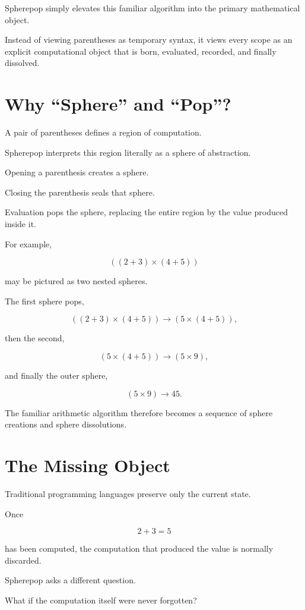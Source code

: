 \documentclass[12pt,oneside]{article}
\theoremstyle{definition}
\theoremstyle{remark}
\begin{document}
Spherepop simply elevates this familiar algorithm into the primary
mathematical object.

Instead of viewing parentheses as temporary syntax,
it views every scope as an explicit computational object that is born,
evaluated,
recorded,
and finally dissolved.

\section{Why ``Sphere'' and ``Pop''?}

A pair of parentheses defines a region of computation.

Spherepop interprets this region literally as a sphere of abstraction.

Opening a parenthesis creates a sphere.

Closing the parenthesis seals that sphere.

Evaluation pops the sphere,
replacing the entire region by the value produced inside it.

For example,

\[
((2+3)\times(4+5))
\]

may be pictured as two nested spheres.

The first sphere pops,

\[
((2+3)\times(4+5))
\rightarrow
(5\times(4+5)),
\]

then the second,

\[
(5\times(4+5))
\rightarrow
(5\times9),
\]

and finally the outer sphere,

\[
(5\times9)
\rightarrow
45.
\]

The familiar arithmetic algorithm therefore becomes a sequence of
sphere creations and sphere dissolutions.

\section{The Missing Object}

Traditional programming languages preserve only the current state.

Once

\[
2+3=5
\]

has been computed,
the computation that produced the value is normally discarded.

Spherepop asks a different question.

What if the computation itself were never forgotten?
\end{document}
